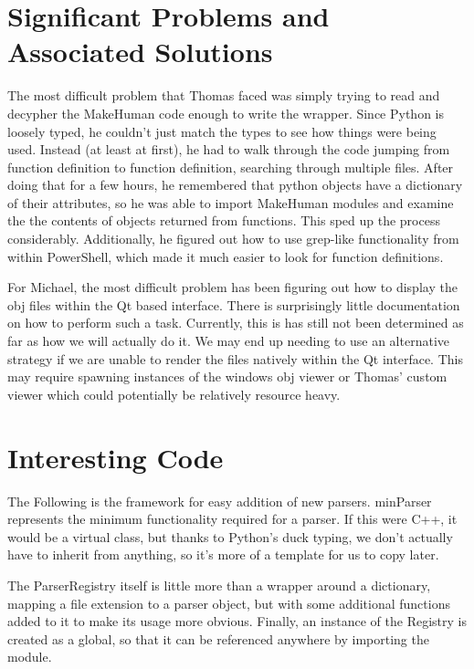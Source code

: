 \documentclass[letterpaper,10pt, onecolumn]{IEEEtran}
\begin{document}
\section*{Significant Problems and Associated Solutions}

The most difficult problem that Thomas faced was simply trying to read and decypher the MakeHuman code enough to write the wrapper. Since Python is loosely typed, he couldn't just match the types to see how things were being used. Instead (at least at first), he had to walk through the code jumping from function definition to function definition, searching through multiple files. After doing that for a few hours, he remembered that python objects have a dictionary of their attributes, so he was able to import MakeHuman modules and examine the the contents of objects returned from functions. This sped up the process considerably. Additionally, he figured out how to use grep-like functionality from within PowerShell, which made it much easier to look for function definitions.

For Michael, the most difficult problem has been figuring out how to display the obj files within the Qt based interface. There is surprisingly little documentation on how to perform such a task. Currently, this is has still not been determined as far as how we will actually do it. We may end up needing to use an alternative strategy if we are unable to render the files natively within the Qt interface. This may require spawning instances of the windows obj viewer or Thomas' custom viewer which could potentially be relatively resource heavy.

\section*{Interesting Code}

The Following is the framework for easy addition of new parsers. minParser represents the minimum functionality required for a parser. If this were C++, it would be a virtual class, but thanks to Python's duck typing, we don't actually have to inherit from anything, so it's more of a template for us to copy later.

The ParserRegistry itself is little more than a wrapper around a dictionary, mapping a file extension to a parser object, but with some additional functions added to it to make its usage more obvious. Finally, an instance of the Registry is created as a global, so that it can be referenced anywhere by importing the module.
\end{document}
